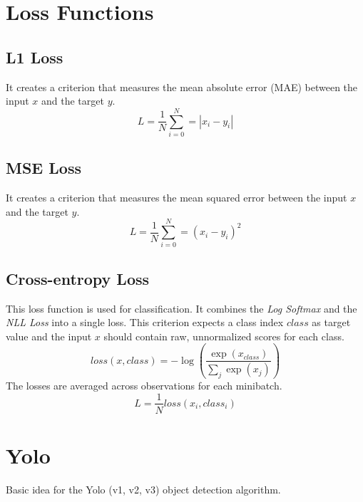 \section{Loss Functions}

\subsection{L1 Loss}
It creates a criterion that measures the mean absolute error (MAE) between the input $x$ and the target $y$.
\begin{equation}
    L = \frac{1}{N} \sum_{i=0}^{N} = |x_i - y_i|
\end{equation}

\subsection{MSE Loss}
It creates a criterion that measures the mean squared error between the input $x$ and the target $y$.
\begin{equation}
    L =  \frac{1}{N} \sum_{i=0}^{N} = (x_i - y_i)^2
\end{equation}

\subsection{Cross-entropy Loss}
This loss function is used for classification. It combines the \textit{Log Softmax} and the \textit{NLL Loss} into a single loss. 
This criterion expects a class index $class$ as target value and the input $x$ should contain raw, unnormalized scores for each class.
\begin{equation}
    loss(x, class) = -\log \left(\frac{\exp(x_{class})}{\sum_j \exp(x_j)}\right)
\end{equation}
The losses are averaged across observations for each minibatch.
\begin{equation}
    L = \frac{1}{N} loss(x_i, class_i)
\end{equation}

\section{Yolo}
Basic idea for the Yolo (v1, v2, v3) object detection algorithm.

